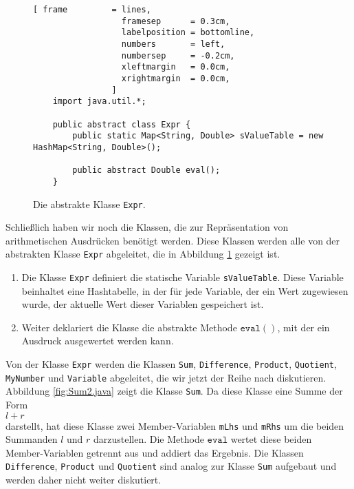 \begin{figure}[!ht]
\centering
\begin{Verbatim}[ frame         = lines, 
                  framesep      = 0.3cm, 
                  labelposition = bottomline,
                  numbers       = left,
                  numbersep     = -0.2cm,
                  xleftmargin   = 0.0cm,
                  xrightmargin  = 0.0cm,
                ]
    import java.util.*;
    
    public abstract class Expr {
        public static Map<String, Double> sValueTable = new HashMap<String, Double>();
        
        public abstract Double eval();
    }
\end{Verbatim}
\vspace*{-0.3cm}
\caption{Die abstrakte Klasse \texttt{Expr}.}
\label{fig:Expr.java}
\end{figure}

 
Schlie{\ss}lich haben wir noch die Klassen, die zur Repr\"asentation von arithmetischen Ausdr\"ucken
ben\"otigt werden.   Diese Klassen werden alle von der abstrakten Klasse \texttt{Expr} abgeleitet, die
in Abbildung \ref{fig:Expr.java} gezeigt ist.  
\begin{enumerate}
\item Die Klasse \texttt{Expr} definiert die statische Variable \texttt{sValueTable}.  Diese Variable
      beinhaltet eine Hash\-tabelle, in der f\"ur jede Variable, der ein Wert zugewiesen wurde,
      der aktuelle Wert dieser Variablen gespeichert ist.
\item Weiter deklariert die Klasse die abstrakte Methode $\texttt{eval}()$, mit der ein
      Ausdruck ausgewertet 
      werden kann.
\end{enumerate}
Von der Klasse
\texttt{Expr} werden die Klassen \texttt{Sum}, \texttt{Difference}, \texttt{Product}, \texttt{Quotient},
\texttt{MyNumber} und \texttt{Variable} abgeleitet, die wir jetzt der Reihe nach diskutieren.
Abbildung \ref{fig:Sum2.java} zeigt die Klasse
\texttt{Sum}.  Da diese Klasse eine Summe der Form
\\[0.2cm]
\hspace*{1.3cm}
$l + r$ 
\\[0.2cm]
darstellt, hat diese Klasse zwei Member-Variablen \texttt{mLhs}  und \texttt{mRhs} um die beiden
Summanden $l$ und $r$ darzustellen.  Die Methode $\texttt{eval}$ wertet diese beiden
Member-Variablen getrennt aus und addiert das Ergebnis.  Die Klassen \texttt{Difference},
\texttt{Product} und \texttt{Quotient} sind analog zur Klasse \texttt{Sum} aufgebaut und werden
daher nicht weiter diskutiert.

